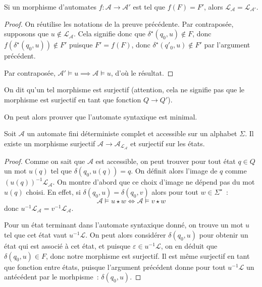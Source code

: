 \begin{proposition}
  Si un morphisme d'automates $f : \mathcal A \to \mathcal A'$ est tel que
  $f(F) = F'$, alors $\mathcal L_\mathcal A = \mathcal L_{\mathcal A'}$.
\end{proposition}

\begin{proof}
  On réutilise les notations de la preuve précédente. Par contraposée, supposons
  que $u \notin \mathcal L_\mathcal A$. Cela signifie donc que
  $\delta^\star(q_0,u) \notin F$, donc $f(\delta^\star(q_0,u)) \notin F'$ puisque
  $F' = f(F)$, donc $\delta^\star(q'_0,u)\notin F'$ par l'argument précédent.

  Par contraposée, $\mathcal A'\models u \implies \mathcal A \models u$, d'où
  le résultat.
\end{proof}

On dit qu'un tel morphisme est surjectif (attention, cela ne signifie pas que le
morphisme est surjectif en tant que fonction $Q \to Q'$).

On peut alors prouver que l'automate syntaxique est minimal.

\begin{proposition}
  Soit $\mathcal A$ un automate fini déterministe complet et accessible sur un
  alphabet $\Sigma$. Il existe un morphisme surjectif
  $\mathcal A \to \mathcal A_{\mathcal L_\mathcal A}$ et surjectif sur les états.
\end{proposition}

\begin{proof}
  Comme on sait que $\mathcal A$ est accessible, on peut trouver pour tout état
  $q \in Q$ un mot $u(q)$ tel que $\delta(q_0,u(q)) = q$. On définit alors
  l'image de $q$ comme $(u(q))^{-1}\mathcal L_\mathcal A$. On montre d'abord que
  ce choix d'image ne dépend pas du mot $u(q)$ choisi. En effet, si
  $\delta(q_0,u) = \delta(q_0,v)$ alors pour tout $w \in \Sigma^\star$~:
  \[\mathcal A \models u\star w \iff \mathcal A \models v \star w\]
  donc $u^{-1}\mathcal L_\mathcal A = v^{-1}\mathcal L_\mathcal A$.

  Pour un état terminant dans l'automate syntaxique donné, on trouve un mot
  $u$ tel que cet état vaut $u^{-1}\mathcal L$. On peut alors considérer
  $\delta(q_0,u)$ pour obtenir un état qui est associé à cet état, et puisque
  $\varepsilon \in u^{-1}\mathcal L$, on en déduit que $\delta(q_0,u)\in F$,
  donc notre morphisme est surjectif. Il est même surjectif en tant que fonction
  entre états, puisque l'argument précédent donne pour tout $u^{-1}\mathcal L$
  un antécédent par le morhpisme~: $\delta(q_0,u)$.
\end{proof}

